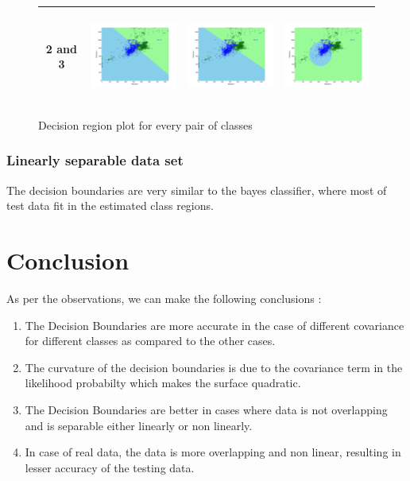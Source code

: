 \documentclass[a4paper]{article}
\begin{document}
\begin{figure}
\begin{tabular}{|c|c|c|c|}
					\hline
					2 and
					3&\includegraphics[width=40mm,height=30mm]{naivebayes/real/pair/23/all_cov.png}&\includegraphics[width=40mm,height=30mm]{naivebayes/real/pair/23/avg_cov.png}
					&\includegraphics[width=40mm,height=30mm]{naivebayes/real/pair/23/diff_cov.png}\\
					\hline
				\end{tabular}
				\caption{Decision region plot for every pair of classes}
			\end{figure}
	



	\subsubsection{Linearly separable data set}
		The decision boundaries are very similar to the bayes classifier, where most
		of test data fit in the estimated class regions.
		
		
		
\section{Conclusion}
	As per the observations, we can make the following conclusions :
	
	\begin{enumerate}
	  \item The Decision Boundaries are more accurate in the case of different
	  covariance for different classes as compared to the other cases.
	  \item The curvature of the decision boundaries is due to the covariance term
	  in the likelihood probabilty which makes the surface quadratic.
	  \item The Decision Boundaries are better in cases where data is not
	  overlapping and is separable either linearly or non linearly.
	  \item In case of real data, the data is more overlapping and non
	  linear, resulting in lesser accuracy of the testing data.
	\end{enumerate}
\end{document}
